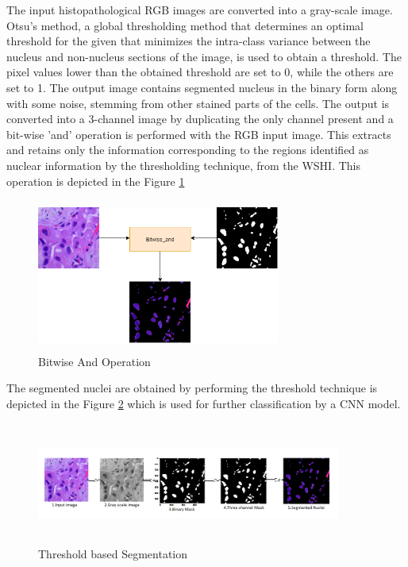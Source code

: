 \documentclass{comjnl}
\begin{document}
 The input histopathological RGB images are converted into a gray-scale image. Otsu's method, a global thresholding method that determines an optimal threshold for the given that minimizes the intra-class variance between the nucleus and non-nucleus sections of the image, is used to obtain a threshold. The pixel values lower than the obtained threshold are set to 0, while the others are set to 1. The output image contains segmented nucleus in the binary form along with some noise, stemming from other stained parts of the cells.  The output is converted into a 3-channel image by duplicating the only channel present and a bit-wise 'and' operation is performed with the RGB input image. This extracts and retains only the information corresponding to the regions identified as nuclear information by the thresholding technique, from the WSHI. This operation is depicted in the Figure \ref{result} 

\begin{figure}[htbp]
\centerline{\includegraphics[width=8cm, height=5cm]{./figures/result.png}}
\caption{Bitwise And Operation}
\label{result}
\end{figure}

The segmented nuclei are obtained by performing the threshold technique is depicted in the Figure \ref{threseg} which is used for further classification by a CNN model.
\begin{figure}[htbp]
\centerline{\includegraphics[width=10cm, height=4cm]{./figures/threseg.png}}
\caption{Threshold based Segmentation}
\label{threseg}
\end{figure}
\end{document}
